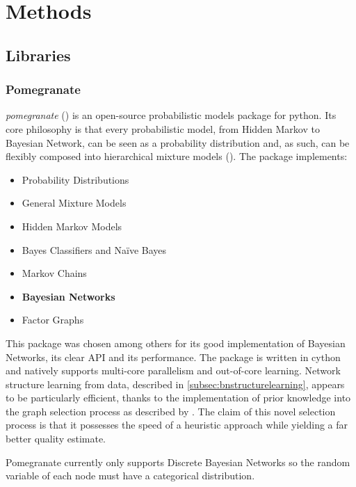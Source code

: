 
\section{Methods} 

\subsection{Libraries}\label{subsec:libraries}
\subsubsection{Pomegranate}
\textit{pomegranate} (\cite{pomegranate}) is an open-source probabilistic models package for python.
Its core philosophy is that every probabilistic model, from Hidden Markov to Bayesian Network, can be seen as a probability distribution and, as such, can be flexibly composed into hierarchical mixture models (\cite{Schreiber2017}).
The package implements:
\begin{itemize}
	\item Probability Distributions
	\item General Mixture Models
	\item Hidden Markov Models
	\item Bayes Classifiers and Na{\"i}ve Bayes
	\item Markov Chains
	\item \textbf{Bayesian Networks}
	\item Factor Graphs
\end{itemize} 

This package was chosen among others for its good implementation of Bayesian Networks, its clear API and its performance.
The package is written in cython and natively supports multi-core parallelism and out-of-core learning.
Network structure learning from data, described in \ref{subsec:bnstructurelearning}, appears to be particularly efficient, thanks to the implementation of prior knowledge into the graph selection process as described by \cite{schreiber_noble_2017}.
The claim of this novel selection process is that it possesses the speed of a heuristic approach while yielding a far better quality estimate.

Pomegranate currently only supports Discrete Bayesian Networks so the random variable of each node must have a categorical distribution.


